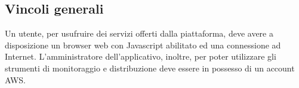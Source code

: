 \subsection{Vincoli generali}
Un utente, per usufruire dei servizi offerti dalla piattaforma, deve avere a disposizione un browser web con Javascript abilitato ed una connessione ad Internet. L'amministratore dell'applicativo, inoltre, per poter utilizzare gli strumenti di monitoraggio e distribuzione deve essere in possesso di un account AWS.